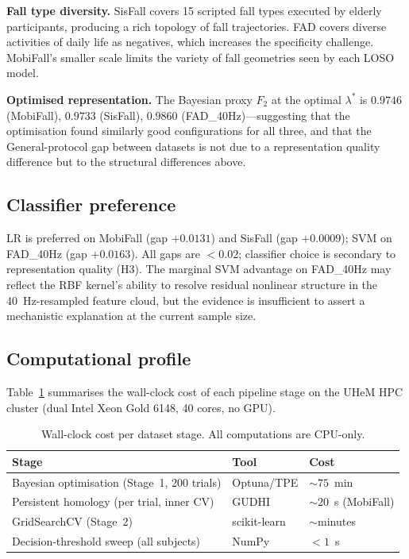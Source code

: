 \textbf{Fall type diversity.}  SisFall covers 15 scripted fall types executed by
elderly participants, producing a rich topology of fall trajectories.  FAD covers
diverse activities of daily life as negatives, which increases the specificity
challenge.  MobiFall's smaller scale limits the variety of fall geometries seen by
each LOSO model.

\textbf{Optimised representation.}  The Bayesian proxy $F_2$ at the optimal $\lambda^*$
is $0.9746$ (MobiFall), $0.9733$ (SisFall), $0.9860$ (FAD\_40Hz)---suggesting that
the optimisation found similarly good configurations for all three, and that the
General-protocol gap between datasets is not due to a representation quality
difference but to the structural differences above.

\subsection{Classifier preference}

LR is preferred on MobiFall (gap $+0.0131$) and SisFall (gap $+0.0009$); SVM on
FAD\_40Hz (gap $+0.0163$).  All gaps are $<0.02$; classifier choice is secondary
to representation quality (H3).  The marginal SVM advantage on FAD\_40Hz may
reflect the RBF kernel's ability to resolve residual nonlinear structure in the
40~Hz-resampled feature cloud, but the evidence is insufficient to assert a
mechanistic explanation at the current sample size.

\subsection{Computational profile}

Table~\ref{tab:compute} summarises the wall-clock cost of each pipeline stage on the
UHeM HPC cluster (dual Intel Xeon Gold 6148, 40 cores, no GPU).

\begin{table}[h!]
\centering
\caption{Wall-clock cost per dataset stage.  All computations are CPU-only.}
\label{tab:compute}
\small
\begin{tabular}{lll}
\toprule
\textbf{Stage} & \textbf{Tool} & \textbf{Cost} \\
\midrule
Bayesian optimisation (Stage~1, 200 trials) & Optuna/TPE & ${\sim}75$~min \\
Persistent homology (per trial, inner CV)   & GUDHI      & ${\sim}20$~s (MobiFall) \\
GridSearchCV (Stage~2)                      & scikit-learn & ${\sim}$minutes \\
Decision-threshold sweep (all subjects)     & NumPy      & $<1$~s \\
\bottomrule
\end{tabular}
\end{table}


